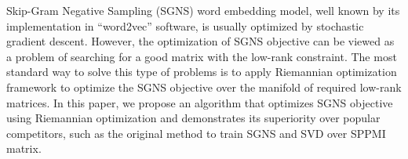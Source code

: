 Skip-Gram Negative Sampling (SGNS) word embedding model, well known by its implementation in ``word2vec'' software, is usually optimized by stochastic gradient descent. However, the optimization of SGNS objective can be viewed as a problem of searching for a good matrix with the low-rank constraint. The most standard way to solve this type of problems is to apply Riemannian optimization framework to optimize the SGNS objective over the manifold of required low-rank matrices. In this paper, we propose an algorithm that optimizes SGNS objective using Riemannian optimization and demonstrates its superiority over popular competitors, such as the original method to train SGNS and SVD over SPPMI matrix.

